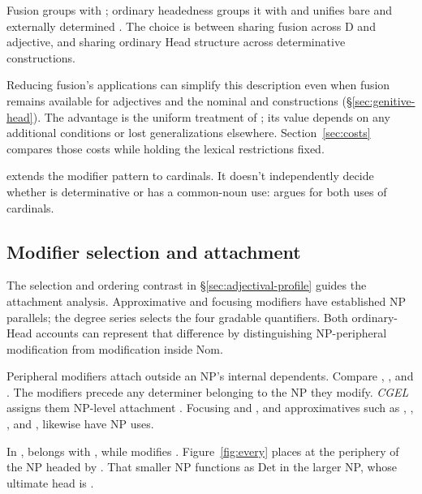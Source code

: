 \documentclass[12pt]{article}
\begin{document}
Fusion groups  with ; ordinary headedness groups it with  and unifies bare and externally determined . The choice is between sharing fusion across D and adjective, and sharing ordinary Head structure across determinative constructions.

Reducing fusion's applications can simplify this description even when fusion remains available for adjectives and the nominal  and  constructions (§\ref{sec:genitive-head}). The advantage is the uniform treatment of ; its value depends on any additional conditions or lost generalizations elsewhere. Section~\ref{sec:costs} compares those costs while holding the lexical restrictions fixed.

 extends the modifier pattern to cardinals. It doesn't independently decide whether  is determinative or has a common-noun use: \textcite{reynolds2026numerals} argues for both uses of cardinals.

\subsection{Modifier selection and attachment}\label{sec:payne}

The selection and ordering contrast in §\ref{sec:adjectival-profile} guides the attachment analysis. Approximative and focusing modifiers have established NP parallels; the degree series selects the four gradable quantifiers. Both ordinary-Head accounts can represent that difference by distinguishing NP-peripheral modification from modification inside Nom.

Peripheral modifiers attach outside an NP's internal dependents. Compare , , and . The modifiers precede any determiner belonging to the NP they modify. \textit{CGEL} assigns them NP-level attachment \citep[430--431]{huddleston2002}. Focusing  and , and approximatives such as , , , and , likewise have NP uses.

In ,  belongs with , while  modifies . Figure~\ref{fig:every} places  at the periphery of the NP headed by . That smaller NP functions as Det in the larger NP, whose ultimate head is .
\end{document}
